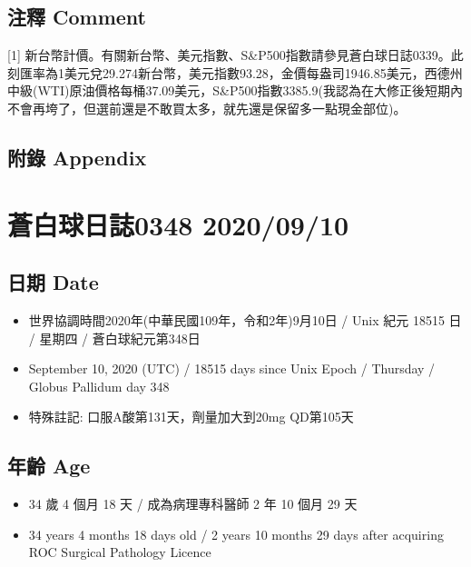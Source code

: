 \documentclass[
]{article}
\providecommand{\tightlist}{%
  \setlength{\itemsep}{0pt}\setlength{\parskip}{0pt}}
\begin{document}
\hypertarget{ux6ce8ux91cb-comment-8}{%
\subsection{注釋 Comment}\label{ux6ce8ux91cb-comment-8}}

{[}1{]}
新台幣計價。有關新台幣、美元指數、S\&P500指數請參見蒼白球日誌0339。此刻匯率為1美元兌29.274新台幣，美元指數93.28，金價每盎司1946.85美元，西德州中級(WTI)原油價格每桶37.09美元，S\&P500指數3385.9(我認為在大修正後短期內不會再垮了，但選前還是不敢買太多，就先還是保留多一點現金部位)。

\hypertarget{ux9644ux9304-appendix-8}{%
\subsection{附錄 Appendix}\label{ux9644ux9304-appendix-8}}

\hypertarget{ux84bcux767dux7403ux65e5ux8a8c0348-20200910}{%
\section{蒼白球日誌0348
2020/09/10}\label{ux84bcux767dux7403ux65e5ux8a8c0348-20200910}}

\hypertarget{ux65e5ux671f-date-9}{%
\subsection{日期 Date}\label{ux65e5ux671f-date-9}}

\begin{itemize}
\tightlist
\item
  世界協調時間2020年(中華民國109年，令和2年)9月10日 / Unix 紀元 18515 日
  / 星期四 / 蒼白球紀元第348日
\item
  September 10, 2020 (UTC) / 18515 days since Unix Epoch / Thursday /
  Globus Pallidum day 348
\item
  特殊註記: 口服A酸第131天，劑量加大到20mg QD第105天
\end{itemize}

\hypertarget{ux5e74ux9f61-age-9}{%
\subsection{年齡 Age}\label{ux5e74ux9f61-age-9}}

\begin{itemize}
\tightlist
\item
  34 歲 4 個月 18 天 / 成為病理專科醫師 2 年 10 個月 29 天
\item
  34 years 4 months 18 days old / 2 years 10 months 29 days after
  acquiring ROC Surgical Pathology Licence
\end{itemize}
\end{document}
